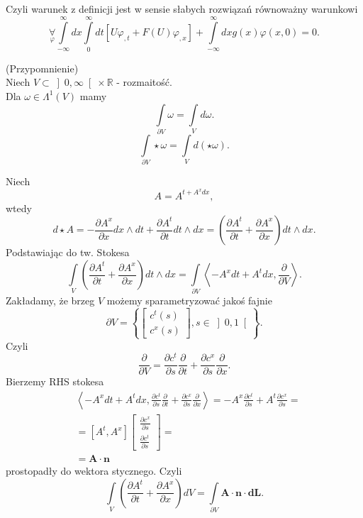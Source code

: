 \documentclass[../main.tex]{subfiles}
\begin{document}
Czyli warunek z definicji jest w sensie słabych rozwiązań równoważny warunkowi
\[
    \underset{\varphi}{\forall} \int\limits_{-\infty}^{\infty} dx \int\limits_{0}^{\infty} dt \left[ U \varphi_{,t} + F(U) \varphi_{,x} \right] + \int\limits_{-\infty}^{\infty} dx g(x)\varphi(x,0) = 0
.\]
\begin{stw}
    (Przypomnienie)\\
    Niech $V\subset \left]0,\infty\right[\times\mathbb{R}$ - rozmaitość.\\
    Dla $\omega\in \Lambda^1(V)$ mamy
    \[
        \int\limits_{\partial V}\omega = \int\limits_V d\omega
    .\]
\[
    \int\limits_{\partial V}\star\omega = \int\limits_V d\left( \star \omega \right)
.\]
\end{stw}
Niech
\[
    A = A^{t + A^x dx}
,\]
wtedy \[
    d\star A = - \frac{\partial A^x}{\partial x} dx\land dt + \frac{\partial A^t}{\partial t} dt\land dx = \left( \frac{\partial A^t}{\partial t} + \frac{\partial A^x}{\partial x}  \right) dt\land dx
.\]
Podstawiając do tw. Stokesa
\[
    \int\limits_{V} \left( \frac{\partial A^t}{\partial t} + \frac{\partial A^x}{\partial x}  \right) dt\land dx = \int\limits_{\partial V}\left<-A^xdt + A^t dx, \frac{\partial }{\partial V}  \right>
.\]
Zakładamy, że brzeg $V$ możemy sparametryzować jakoś fajnie
\[
    \partial V = \left\{ \begin{bmatrix} c^t(s)\\c^x(s) \end{bmatrix} , s\in \left]0,1\right[ \right\}
.\]
Czyli
\[
    \frac{\partial }{\partial V} = \frac{\partial c^t}{\partial s} \frac{\partial }{\partial t} + \frac{\partial c^x}{\partial s} \frac{\partial }{\partial x}
.\]
Bierzemy RHS stokesa
\begin{align*}
    &\left<-A^xdt + A^t dx, \frac{\partial c^t}{\partial s} \frac{\partial }{\partial t} + \frac{\partial c^x}{\partial s} \frac{\partial }{\partial x}  \right> = -A^x \frac{\partial c^t}{\partial s} + A^t \frac{\partial c^x}{\partial s} = \\
    &= \left[ A^t, A^x \right] \begin{bmatrix} \frac{\partial c^x}{\partial s} \\ \frac{\partial c^t}{\partial s}  \end{bmatrix} = \\
        &= \mathbf{A} \cdot \mathbf{n}
\end{align*}
prostopadły do wektora stycznego. Czyli
\[
    \int\limits_V\left( \frac{\partial A^t}{\partial t} + \frac{\partial A^x}{\partial x}  \right) dV = \int\limits_{\partial V}\mathbf{A}\cdot \mathbf{n} \cdot \mathbf{dL}
.\]
\end{document}
